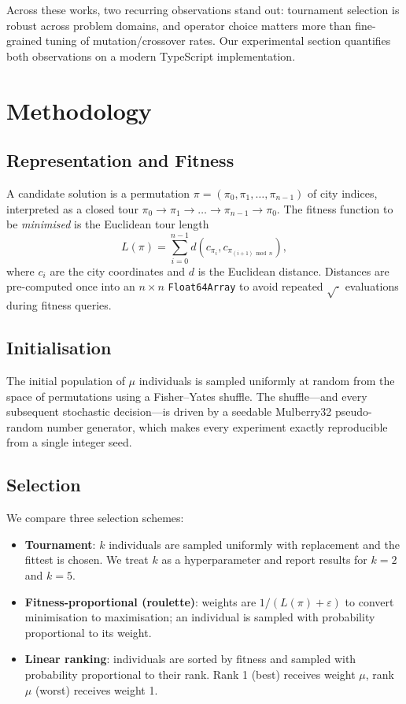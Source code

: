 \documentclass[conference]{IEEEtran}
\begin{document}
Across these works, two recurring observations stand out: tournament
selection is robust across problem domains, and operator choice matters
more than fine-grained tuning of mutation/crossover rates. Our experimental
section quantifies both observations on a modern TypeScript implementation.

\section{Methodology}\label{sec:method}

\subsection{Representation and Fitness}

A candidate solution is a permutation $\pi = (\pi_0, \pi_1, \dots,
\pi_{n-1})$ of city indices, interpreted as a closed tour
$\pi_0 \to \pi_1 \to \dots \to \pi_{n-1} \to \pi_0$. The fitness function
to be \emph{minimised} is the Euclidean tour length
\[
L(\pi) = \sum_{i=0}^{n-1} d(c_{\pi_i}, c_{\pi_{(i+1) \bmod n}}),
\]
where $c_i$ are the city coordinates and $d$ is the Euclidean distance.
Distances are pre-computed once into an $n \times n$ \texttt{Float64Array}
to avoid repeated $\sqrt{\cdot}$ evaluations during fitness queries.

\subsection{Initialisation}

The initial population of $\mu$ individuals is sampled uniformly at random
from the space of permutations using a Fisher--Yates shuffle. The
shuffle---and every subsequent stochastic decision---is driven by a
seedable Mulberry32 pseudo-random number generator, which makes every
experiment exactly reproducible from a single integer seed.

\subsection{Selection}

We compare three selection schemes:
\begin{itemize}
\item \textbf{Tournament}: $k$ individuals are sampled uniformly with
replacement and the fittest is chosen. We treat $k$ as a hyperparameter
and report results for $k=2$ and $k=5$.
\item \textbf{Fitness-proportional (roulette)}: weights are
$1/(L(\pi)+\varepsilon)$ to convert minimisation to maximisation; an
individual is sampled with probability proportional to its weight.
\item \textbf{Linear ranking}: individuals are sorted by fitness and
sampled with probability proportional to their rank. Rank 1 (best)
receives weight $\mu$, rank $\mu$ (worst) receives weight 1.
\end{itemize}
\end{document}
